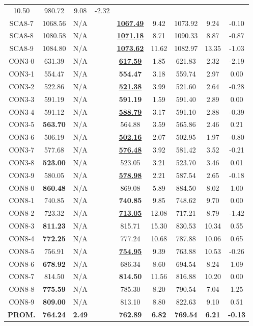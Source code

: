 \begin{table}[h]
\begin{tabular*}{1.00\textwidth}{@{\extracolsep{\fill}} |c||c c||c c c c c c|}
10.50 & 980.72 & 9.08 & -2.32\\SCA8-7 & 1068.56 & N/A & & \bf{\underline{1067.49}} & 
9.42 & 1073.92 & 9.24 & -0.10\\SCA8-8 & 1080.58 & N/A & & \bf{\underline{1071.18}} & 
8.71 & 1090.33 & 8.87 & -0.87\\SCA8-9 & 1084.80 & N/A & & \bf{\underline{1073.62}} & 
11.62 & 1082.97 & 13.35 & -1.03\\CON3-0 & 631.39 & N/A & & \bf{\underline{617.59}} & 
1.85 & 621.83 & 2.32 & -2.19\\CON3-1 & 554.47 & N/A & & \bf{554.47} & 
3.18 & 559.74 & 2.97 & 0.00\\CON3-2 & 522.86 & N/A & & \bf{\underline{521.38}} & 
3.99 & 521.60 & 2.64 & -0.28\\CON3-3 & 591.19 & N/A & & \bf{591.19} & 
1.59 & 591.40 & 2.89 & 0.00\\CON3-4 & 591.12 & N/A & & \bf{\underline{588.79}} & 
3.17 & 591.10 & 2.88 & -0.39\\CON3-5 & \bf{563.70} & N/A & & 
564.88 & 3.59 & 565.86 & 2.46 & 0.21\\CON3-6 & 506.19 & N/A & & \bf{\underline{502.16}} & 
2.07 & 502.95 & 1.97 & -0.80\\CON3-7 & 577.68 & N/A & & \bf{\underline{576.48}} & 
3.92 & 581.42 & 3.52 & -0.21\\CON3-8 & \bf{523.00} & N/A & & 
523.05 & 3.21 & 523.70 & 3.46 & 0.01\\CON3-9 & 580.05 & N/A & & \bf{\underline{578.98}} & 
2.21 & 587.54 & 2.65 & -0.18\\CON8-0 & \bf{860.48} & N/A & & 
869.08 & 5.89 & 884.50 & 8.02 & 1.00\\CON8-1 & 740.85 & N/A & & \bf{740.85} & 
9.85 & 748.62 & 9.70 & 0.00\\CON8-2 & 723.32 & N/A & & \bf{\underline{713.05}} & 
12.08 & 717.21 & 8.79 & -1.42\\CON8-3 & \bf{811.23} & N/A & & 
815.71 & 15.30 & 830.53 & 10.34 & 0.55\\CON8-4 & \bf{772.25} & N/A & & 
777.24 & 10.68 & 787.88 & 10.06 & 0.65\\CON8-5 & 756.91 & N/A & & \bf{\underline{754.95}} & 
9.39 & 763.88 & 10.53 & -0.26\\CON8-6 & \bf{678.92} & N/A & & 
686.34 & 8.60 & 694.54 & 8.24 & 1.09\\CON8-7 & 814.50 & N/A & & \bf{814.50} & 
11.56 & 816.88 & 10.20 & 0.00\\CON8-8 & \bf{775.59} & N/A & & 
785.30 & 8.20 & 790.54 & 7.04 & 1.25\\CON8-9 & \bf{809.00} & N/A & & 
813.10 & 8.80 & 822.63 & 9.10 & 0.51\\\hline\hline\bf{PROM.} & 
\bf{764.24} & \bf{2.49} & & \bf{762.89} & \bf{6.82} & \bf{769.54} & \bf{6.21} & \bf{-0.13}\\[1ex]\hline
\end{tabular*}
\label{apendice-table:finalD-SCA}
\end{table}

